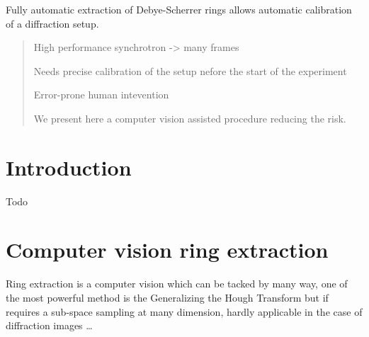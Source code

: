 \documentclass[preprint]{iucr}              %
\begin{document}

\maketitle                        %

\begin{synopsis}
Fully automatic extraction of Debye-Scherrer rings allows automatic calibration
of a diffraction setup. 
\end{synopsis}

\begin{abstract}
High performance synchrotron -> many frames

Needs precise calibration of the setup nefore the start of the experiment

Error-prone human intevention 

We present here a computer vision assisted procedure reducing the risk. 
\end{abstract}



\section{Introduction}

Todo

\section{Computer vision ring extraction}

Ring extraction is a computer vision which can be tacked by many way,
one of the most powerful method is the Generalizing the Hough Transform
but if requires a sub-space sampling at many dimension, hardly applicable in
the case of diffraction images \ldots 
\end{document}
